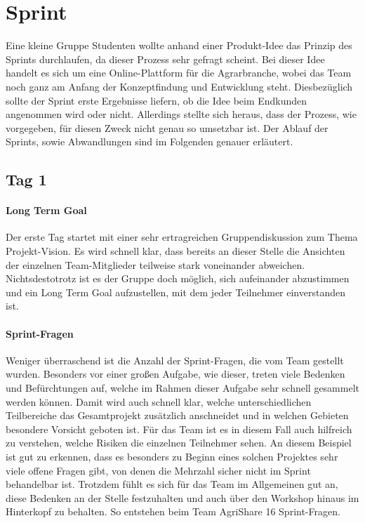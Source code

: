 \section{Sprint}
Eine kleine Gruppe Studenten wollte anhand einer Produkt-Idee das Prinzip des Sprints durchlaufen, da dieser Prozess sehr gefragt scheint. Bei dieser Idee handelt es sich um eine Online-Plattform für die Agrarbranche, wobei das Team noch ganz am Anfang der Konzeptfindung und Entwicklung steht. Diesbezüglich sollte der Sprint erste Ergebnisse liefern, ob die Idee beim Endkunden angenommen wird oder nicht. Allerdings stellte sich heraus, dass der Prozess, wie vorgegeben, für diesen Zweck nicht genau so umsetzbar ist. Der Ablauf der Sprints, sowie Abwandlungen sind im Folgenden genauer erläutert.
\subsection*{Tag 1}
\paragraph{Long Term Goal}
Der erste Tag startet mit einer sehr ertragreichen Gruppendiskussion zum Thema Projekt-Vision. Es wird schnell klar, dass bereits an dieser Stelle die Ansichten der einzelnen Team-Mitglieder teilweise stark voneinander abweichen. Nichtsdestotrotz ist es der Gruppe doch möglich, sich aufeinander abzustimmen und ein Long Term Goal aufzustellen, mit dem jeder Teilnehmer einverstanden ist.
%
%
\paragraph{Sprint-Fragen}
Weniger überraschend ist die Anzahl der Sprint-Fragen, die vom Team gestellt wurden. Besonders vor einer großen Aufgabe, wie dieser, treten viele Bedenken und Befürchtungen auf, welche im Rahmen dieser Aufgabe sehr schnell gesammelt werden können. Damit wird auch schnell klar, welche unterschiedlichen Teilbereiche das Gesamtprojekt zusätzlich anschneidet und in welchen Gebieten besondere Vorsicht geboten ist. Für das Team ist es in diesem Fall auch hilfreich zu verstehen, welche Risiken die einzelnen Teilnehmer sehen. An diesem Beispiel ist gut zu erkennen, dass es besonders zu Beginn eines solchen Projektes sehr viele offene Fragen gibt, von denen die Mehrzahl sicher nicht im Sprint behandelbar ist. Trotzdem fühlt es sich für das Team im Allgemeinen gut an, diese Bedenken an der Stelle festzuhalten und auch über den Workshop hinaus im Hinterkopf zu behalten. So entstehen beim Team AgriShare 16 Sprint-Fragen.

